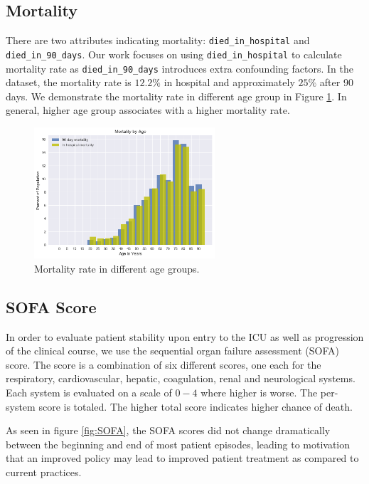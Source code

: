 \documentclass[letterpaper]{article}
\begin{document}
\subsection{Mortality}

There are two attributes indicating mortality: \texttt{died\_in\_hospital} and \texttt{died\_in\_90\_days}. Our work focuses on using \texttt{died\_in\_hospital} to calculate mortality rate as \texttt{died\_in\_90\_days} introduces extra confounding factors. 
In the dataset, the mortality rate is $12.2\%$ in hospital and approximately $25\%$ after 90 days. We demonstrate the mortality rate in different age group in Figure \ref{fig:mort_by_age}. In general, higher age group associates with a higher mortality rate.

\begin{figure}[H]
\centering
\includegraphics[width=0.6\textwidth]{figures/mort_by_age.png}
\caption{\label{fig:mort_by_age} Mortality rate in different age groups.}
\end{figure}

\subsection{SOFA Score}

In order to evaluate patient stability upon entry to the ICU as well as progression of the clinical
course, we use the sequential organ failure assessment (SOFA) score.
The score is a combination of six different scores, one each for the respiratory, cardiovascular, hepatic, coagulation, renal and neurological systems. Each system is evaluated on a scale of $0-4$
where higher is worse. The per-system score is totaled.
The higher total score indicates higher chance of death.

As seen in figure \ref{fig:SOFA}, the SOFA scores did not change dramatically between the
beginning and end of most patient episodes, leading to motivation that an improved policy may lead to 
improved patient treatment as compared to current practices.
\end{document}
